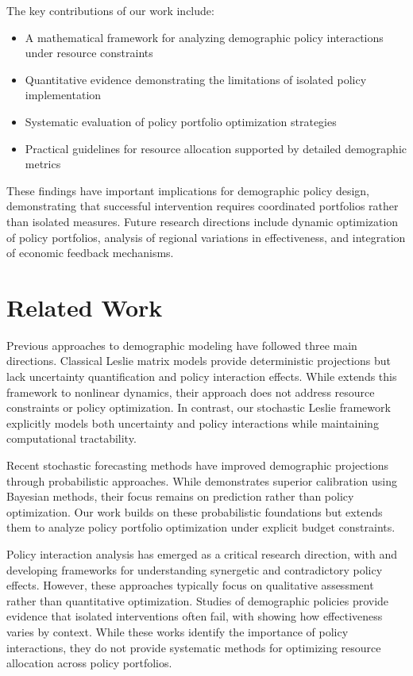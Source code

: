 \documentclass{article} %
\begin{document}
The key contributions of our work include:
\begin{itemize}
    \item A mathematical framework for analyzing demographic policy interactions under resource constraints
    \item Quantitative evidence demonstrating the limitations of isolated policy implementation
    \item Systematic evaluation of policy portfolio optimization strategies
    \item Practical guidelines for resource allocation supported by detailed demographic metrics
\end{itemize}

These findings have important implications for demographic policy design, demonstrating that successful intervention requires coordinated portfolios rather than isolated measures. Future research directions include dynamic optimization of policy portfolios, analysis of regional variations in effectiveness, and integration of economic feedback mechanisms.

\section{Related Work}
\label{sec:related}

Previous approaches to demographic modeling have followed three main directions. Classical Leslie matrix models \cite{Grant1996TheIO,Malafeyev2024ModelingAD,López2022MonitoringIA} provide deterministic projections but lack uncertainty quantification and policy interaction effects. While \cite{López2022MonitoringIA} extends this framework to nonlinear dynamics, their approach does not address resource constraints or policy optimization. In contrast, our stochastic Leslie framework explicitly models both uncertainty and policy interactions while maintaining computational tractability.

Recent stochastic forecasting methods \cite{Booth2020CoherentMF,Billari2014StochasticPF,Yu2023ProbabilisticCP} have improved demographic projections through probabilistic approaches. While \cite{Yu2023ProbabilisticCP} demonstrates superior calibration using Bayesian methods, their focus remains on prediction rather than policy optimization. Our work builds on these probabilistic foundations but extends them to analyze policy portfolio optimization under explicit budget constraints.

Policy interaction analysis has emerged as a critical research direction, with \cite{Dijk2020ForksIT} and \cite{Wei2024TheSE} developing frameworks for understanding synergetic and contradictory policy effects. However, these approaches typically focus on qualitative assessment rather than quantitative optimization. Studies of demographic policies \cite{Cook2022TryingTR,Zakharov2024ThreeDO} provide evidence that isolated interventions often fail, with \cite{Zhang2023TheEO} showing how effectiveness varies by context. While these works identify the importance of policy interactions, they do not provide systematic methods for optimizing resource allocation across policy portfolios.
\end{document}
